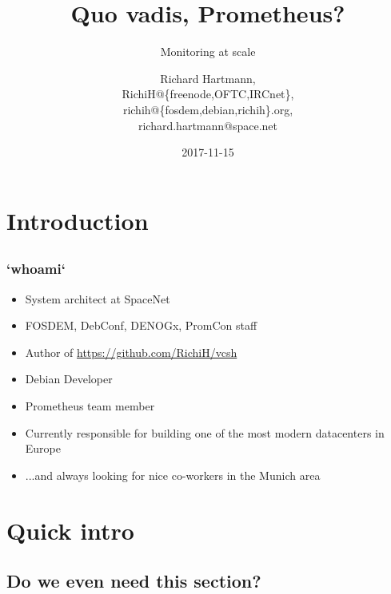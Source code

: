 \documentclass[t]{beamer}
\title{Quo vadis, Prometheus?}
\subtitle{Monitoring at scale}
\author{Richard Hartmann,\\
RichiH@\{freenode,OFTC,IRCnet\},\\
richih@\{fosdem,debian,richih\}.org,\\
richard.hartmann@space.net}
\date{2017-11-15}
\begin{document}
\setcounter{tocdepth}{1}

\section{Introduction}

\subsection{}

\begin{frame}
	\titlepage
\end{frame}


\subsection{}

\begin{frame}
	\frametitle{`whoami`}
	\begin{itemize}
		\item System architect at SpaceNet
		\item FOSDEM, DebConf, DENOGx, PromCon staff
		\item Author of \url{https://github.com/RichiH/vcsh}
		\item Debian Developer
		\item Prometheus team member
		\item Currently responsible for building one of the most modern datacenters in Europe
		\item ...and always looking for nice co-workers in the Munich area
	\end{itemize}
\end{frame}


\section{Quick intro}

\subsection{Do we even need this section?}

\end{document}
